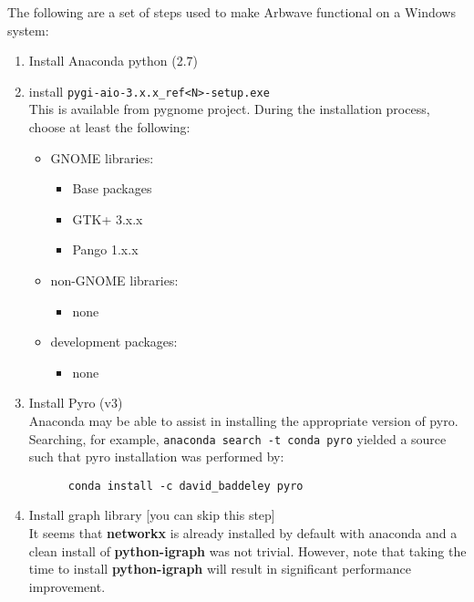 The following are a set of steps used to make Arbwave functional on a Windows system:
\begin{enumerate}
  \item Install Anaconda python (2.7)
  \item install \verb|pygi-aio-3.x.x_ref<N>-setup.exe| \\
    This is available from pygnome project.
    During the installation process, choose at least the following:
    \begin{itemize}
      \item GNOME libraries:
        \begin{itemize}
          \item Base packages
          \item GTK+ 3.x.x
          \item Pango 1.x.x
        \end{itemize}
      \item non-GNOME libraries:
        \begin{itemize}
          \item none
        \end{itemize}
      \item development packages:
        \begin{itemize}
          \item none
        \end{itemize}
    \end{itemize}

  \item Install Pyro (v3) \\
    Anaconda may be able to assist in installing the appropriate version of pyro.
      Searching, for example, \verb|anaconda search -t conda pyro| yielded a source such
    that pyro installation was performed by:
    \begin{verbatim}
      conda install -c david_baddeley pyro
    \end{verbatim}

  \item Install graph library [you can skip this step] \\
    It seems that \textbf{networkx} is already installed by default with
    anaconda and a clean install of \textbf{python-igraph}
    was not trivial.  However, note that taking the time to install 
    \textbf{python-igraph} will result in significant performance improvement.


\end{enumerate}
